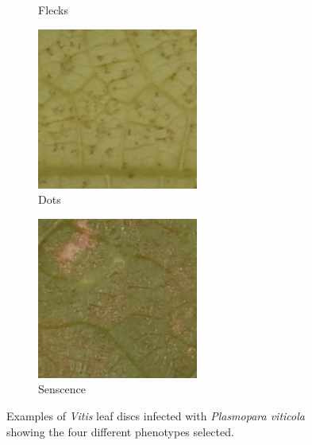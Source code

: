 \documentclass[english]{article}
\begin{document}
\begin{figure}[H]
\begin{subfigure}[b]{0.2\linewidth}
        \caption{Flecks}\label{fig:flecks}
    \end{subfigure}
    \begin{subfigure}[b]{0.2\linewidth}
        \includegraphics[width=\linewidth]{p_viticola/resources/images/2023_oiv_a_dots.png}
        \caption{Dots}\label{fig:dots}
    \end{subfigure}
    \begin{subfigure}[b]{0.2\linewidth}
        \includegraphics[width=\linewidth]{p_viticola/resources/images/2023_a_oiv_senescence.png}
        \caption{Senscence}\label{fig:senescence}
    \end{subfigure}
    \caption{Examples of \textit{Vitis} leaf discs infected with \textit{Plasmopara viticola} showing the four different phenotypes selected.}
\end{figure}
\end{document}
